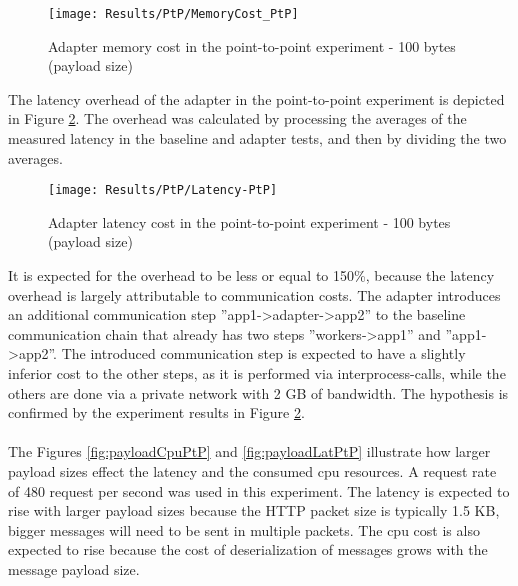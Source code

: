 \begin{figure}[htbp]
    \centering
    \centerline{\texttt{[image: Results/PtP/MemoryCost\_PtP]}}
    \caption{Adapter memory cost in the point-to-point experiment - 100 bytes (payload size)}
    \label{fig:memCostPtp}
\end{figure}

\newpage

The latency overhead of the adapter in the point-to-point experiment is depicted in Figure \ref{fig:latPtP}.
The overhead was calculated by processing the averages of the measured latency in the baseline and adapter tests, and then by dividing the two averages.

\begin{figure}[htbp]
    \centering
    \centerline{\texttt{[image: Results/PtP/Latency-PtP]}}
    \caption{Adapter latency cost in the point-to-point experiment - 100 bytes (payload size)}
    \label{fig:latPtP}
\end{figure}

It is expected for the overhead to be less or equal to 150\%, because the latency overhead is largely attributable to communication costs.
The adapter introduces an additional communication step ''app1->adapter->app2'' to the baseline communication chain that already has two steps ''workers->app1'' and ''app1->app2''.
The introduced communication step is expected to have a slightly inferior cost to the other steps, as it is performed via interprocess-calls, while the others are done via a private network with 2 GB of bandwidth.
The hypothesis is confirmed by the experiment results in Figure \ref{fig:latPtP}.

\paragraph{}

The Figures  \ref{fig:payloadCpuPtP} and \ref{fig:payloadLatPtP} illustrate how larger payload sizes effect the latency and the consumed cpu resources.
A request rate of 480 request per second was used in this experiment.
The latency is expected to rise with larger payload sizes because the HTTP packet size is typically 1.5 KB, bigger messages will need to be sent in multiple packets.
The cpu cost is also expected to rise because the cost of deserialization of messages grows with the message payload size.

\paragraph{}

